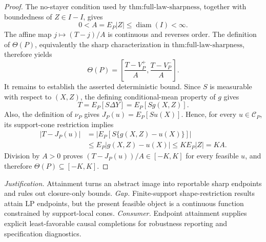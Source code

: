 \documentclass{article}
\begin{document}
\begin{proof}
The no-stayer condition used by \(\text{thm:full-law-sharpness}\), together with boundedness of \(Z\in I-I\), gives
\[
 0<A=E_P|Z|\leq\operatorname{diam}(I)<\infty.
\]
The affine map \(j\mapsto(T-j)/A\) is continuous and reverses order.  The definition of \(\Theta(P)\), equivalently the sharp characterization in \(\text{thm:full-law-sharpness}\), therefore yields
\[
 \Theta(P)=
 \left[\frac{T-V_P^+}{A},\frac{T-V_P^-}{A}\right].
\]
It remains to establish the asserted deterministic bound.  Since \(S\) is measurable with respect to \((X,Z)\), the defining conditional-mean property of \(g\) gives
\[
 T=E_P[S\Delta Y]=E_P[Sg(X,Z)].
\]
Also, the definition of \(\nu_P\) gives \(J_P(u)=E_P[Su(X)]\).  Hence, for every \(u\in\mathcal C_P\), its support-cone restriction implies
\[
 \begin{aligned}
 |T-J_P(u)|
 &=\left|E_P[S\{g(X,Z)-u(X)\}]\right|\\
 &\leq E_P|g(X,Z)-u(X)|
 \leq K E_P|Z|=KA.
 \end{aligned}
\]
Division by \(A>0\) proves \((T-J_P(u))/A\in[-K,K]\) for every feasible \(u\), and therefore \(\Theta(P)\subseteq[-K,K]\).
\end{proof}
\par\smallskip\noindent \textit{Justification.} Attainment turns an abstract image into reportable sharp endpoints and rules out closure-only bounds. \textit{Gap.} Finite-support shape-restriction results attain LP endpoints, but the present feasible object is a continuous function constrained by support-local cones. \textit{Consumer.} Endpoint attainment supplies explicit least-favorable causal completions for robustness reporting and specification diagnostics.
\end{document}

